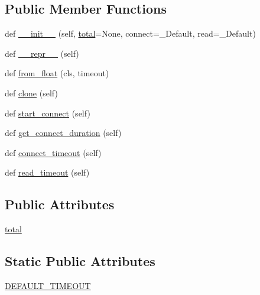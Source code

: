 \subsection*{Public Member Functions}
\begin{DoxyCompactItemize}
\item 
def \hyperlink{classpip_1_1__vendor_1_1urllib3_1_1util_1_1timeout_1_1Timeout_a95d7bf91164983c9b8e92e818bc42eb5}{\+\_\+\+\_\+init\+\_\+\+\_\+} (self, \hyperlink{classpip_1_1__vendor_1_1urllib3_1_1util_1_1timeout_1_1Timeout_a88da27bdf2a3046ec4d250c68adaf9d8}{total}=None, connect=\+\_\+\+Default, read=\+\_\+\+Default)
\item 
def \hyperlink{classpip_1_1__vendor_1_1urllib3_1_1util_1_1timeout_1_1Timeout_a9a76003f9636c1bcf4237db00466b1a9}{\+\_\+\+\_\+repr\+\_\+\+\_\+} (self)
\item 
def \hyperlink{classpip_1_1__vendor_1_1urllib3_1_1util_1_1timeout_1_1Timeout_a8cdbc1816a9c7a7ce81f3040ef7bc4a5}{from\+\_\+float} (cls, timeout)
\item 
def \hyperlink{classpip_1_1__vendor_1_1urllib3_1_1util_1_1timeout_1_1Timeout_adf3e93289276c7920b5bfa24ce7ad651}{clone} (self)
\item 
def \hyperlink{classpip_1_1__vendor_1_1urllib3_1_1util_1_1timeout_1_1Timeout_a53b5261d7c65cda49be436bd2725d56e}{start\+\_\+connect} (self)
\item 
def \hyperlink{classpip_1_1__vendor_1_1urllib3_1_1util_1_1timeout_1_1Timeout_afddcb98e83bd70962fec705090d0bd98}{get\+\_\+connect\+\_\+duration} (self)
\item 
def \hyperlink{classpip_1_1__vendor_1_1urllib3_1_1util_1_1timeout_1_1Timeout_a11c5e5576fdd38589cae3145439f0eeb}{connect\+\_\+timeout} (self)
\item 
def \hyperlink{classpip_1_1__vendor_1_1urllib3_1_1util_1_1timeout_1_1Timeout_a80e30330a46f06753000948ee107cc2c}{read\+\_\+timeout} (self)
\end{DoxyCompactItemize}
\subsection*{Public Attributes}
\begin{DoxyCompactItemize}
\item 
\hyperlink{classpip_1_1__vendor_1_1urllib3_1_1util_1_1timeout_1_1Timeout_a88da27bdf2a3046ec4d250c68adaf9d8}{total}
\end{DoxyCompactItemize}
\subsection*{Static Public Attributes}
\begin{DoxyCompactItemize}
\item 
\hyperlink{classpip_1_1__vendor_1_1urllib3_1_1util_1_1timeout_1_1Timeout_ab2e2090779413149cdac51e5b0908e12}{D\+E\+F\+A\+U\+L\+T\+\_\+\+T\+I\+M\+E\+O\+UT}
\end{DoxyCompactItemize}


